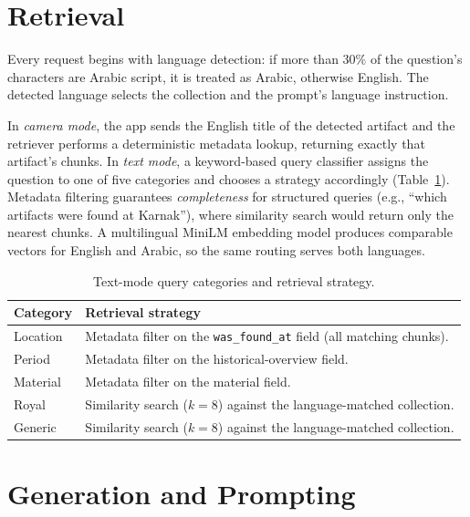 \section{Retrieval}

Every request begins with language detection: if more than $30\%$ of the question's
characters are Arabic script, it is treated as Arabic, otherwise English. The detected
language selects the collection and the prompt's language instruction.

In \emph{camera mode}, the app sends the English title of the detected artifact and the
retriever performs a deterministic metadata lookup, returning exactly that artifact's
chunks. In \emph{text mode}, a keyword-based query classifier assigns the question to
one of five categories and chooses a strategy accordingly (Table~\ref{tab:querycat}).
Metadata filtering guarantees \emph{completeness} for structured queries (e.g.,
``which artifacts were found at Karnak''), where similarity search would return only
the nearest chunks. A multilingual MiniLM embedding model produces comparable vectors
for English and Arabic, so the same routing serves both languages.

\begin{table}[htbp]
\centering
\caption{Text-mode query categories and retrieval strategy.}
\label{tab:querycat}
\begin{tabularx}{\textwidth}{@{}lX@{}}
\toprule
\textbf{Category} & \textbf{Retrieval strategy}\\
\midrule
Location & Metadata filter on the \texttt{was\_found\_at} field (all matching chunks).\\
Period   & Metadata filter on the historical-overview field.\\
Material & Metadata filter on the material field.\\
Royal    & Similarity search ($k=8$) against the language-matched collection.\\
Generic  & Similarity search ($k=8$) against the language-matched collection.\\
\bottomrule
\end{tabularx}
\end{table}

\section{Generation and Prompting}


